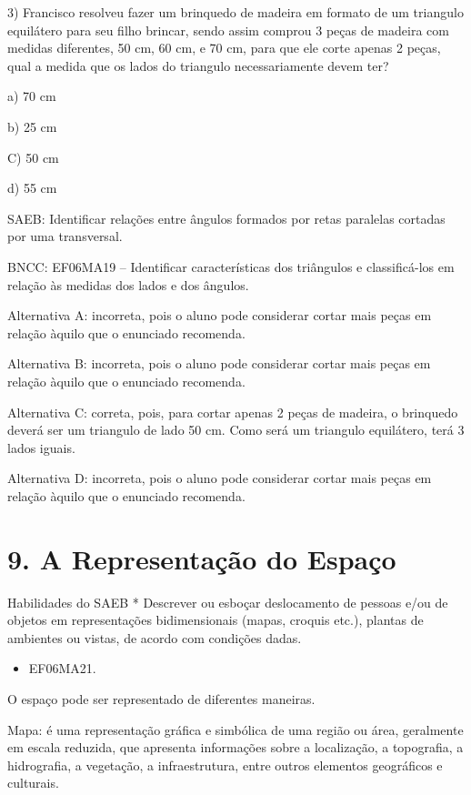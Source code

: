 3) Francisco resolveu fazer um brinquedo de madeira em formato de um
triangulo equilátero para seu filho brincar, sendo assim comprou 3 peças
de madeira com medidas diferentes, 50 cm, 60 cm, e 70 cm, para que ele
corte apenas 2 peças, qual a medida que os lados do triangulo
necessariamente devem ter?

a) 70 cm

b) 25 cm

C) 50 cm

d) 55 cm

SAEB: Identificar relações entre ângulos formados por retas paralelas
cortadas por uma transversal.

BNCC: EF06MA19 -- Identificar características dos triângulos e
classificá-los em relação às medidas dos lados e dos ângulos.

Alternativa A: incorreta, pois o aluno pode considerar cortar mais peças
em relação àquilo que o enunciado recomenda.

Alternativa B: incorreta, pois o aluno pode considerar cortar mais peças
em relação àquilo que o enunciado recomenda.

Alternativa C: correta, pois, para cortar apenas 2 peças de madeira, o
brinquedo deverá ser um triangulo de lado 50 cm. Como será um triangulo
equilátero, terá 3 lados iguais.

Alternativa D: incorreta, pois o aluno pode considerar cortar mais peças
em relação àquilo que o enunciado recomenda.

\chapter{9. A Representação do
Espaço}

Habilidades do SAEB * Descrever ou esboçar deslocamento de pessoas e/ou
de objetos em representações bidimensionais (mapas, croquis etc.),
plantas de ambientes ou vistas, de acordo com condições dadas.


\begin{itemize}
\item EF06MA21.
\end{itemize}

O espaço pode ser representado de diferentes maneiras.

Mapa: é uma representação gráfica e simbólica de uma região ou área,
geralmente em escala reduzida, que apresenta informações sobre a
localização, a topografia, a hidrografia, a vegetação, a infraestrutura,
entre outros elementos geográficos e culturais.

